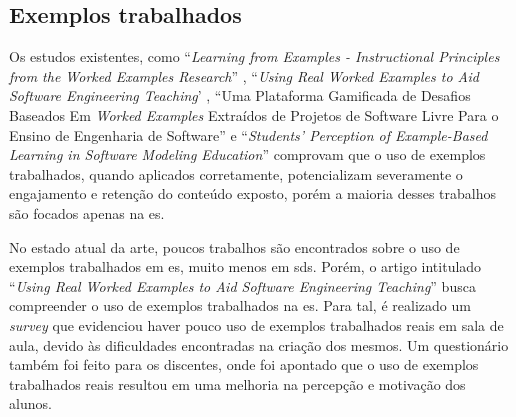 \subsection{Exemplos trabalhados}

Os estudos existentes, como ``\textit{Learning from Examples - Instructional Principles from the Worked Examples Research}'' \cite{Robert.Atkinson-etal:2000}, ``\textit{Using Real Worked Examples to Aid Software Engineering Teaching}' \cite{Simone.Tonhao-etal:2021}, ``Uma Plataforma Gamificada de Desafios Baseados Em \textit{Worked Examples} Extraídos de Projetos de Software Livre Para o Ensino de Engenharia de Software'' \cite{Simone.Tonhao-etal:2022} e ``\textit{Students' Perception of Example-Based Learning in Software Modeling Education}'' \cite{Tiago.Bonetti-etal:2023} comprovam que o uso de exemplos trabalhados, quando aplicados corretamente, potencializam severamente o engajamento e retenção do conteúdo exposto, porém a maioria desses trabalhos são focados apenas na \gls{es}. 

No estado atual da arte, poucos trabalhos são encontrados sobre o uso de exemplos trabalhados em \gls{es}, muito menos em \gls{sds}. Porém, o artigo intitulado ``\textit{Using Real Worked Examples to Aid Software Engineering Teaching}'' \cite{Simone.Tonhao-etal:2021} busca compreender o uso de exemplos trabalhados na \gls{es}. Para tal, é realizado um \textit{survey} que evidenciou haver pouco uso de exemplos trabalhados reais em sala de aula, devido às dificuldades encontradas na criação dos mesmos. Um questionário também foi feito para os discentes, onde foi apontado que o uso de exemplos trabalhados reais resultou em uma melhoria na percepção e motivação dos alunos.



